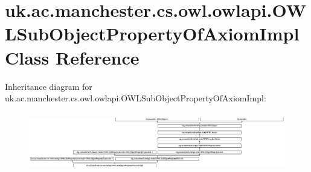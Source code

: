\hypertarget{classuk_1_1ac_1_1manchester_1_1cs_1_1owl_1_1owlapi_1_1_o_w_l_sub_object_property_of_axiom_impl}{\section{uk.\-ac.\-manchester.\-cs.\-owl.\-owlapi.\-O\-W\-L\-Sub\-Object\-Property\-Of\-Axiom\-Impl Class Reference}
\label{classuk_1_1ac_1_1manchester_1_1cs_1_1owl_1_1owlapi_1_1_o_w_l_sub_object_property_of_axiom_impl}
}
Inheritance diagram for uk.\-ac.\-manchester.\-cs.\-owl.\-owlapi.\-O\-W\-L\-Sub\-Object\-Property\-Of\-Axiom\-Impl\-:\begin{figure}[H]
\begin{center}
\leavevmode
\includegraphics[height=2.615295cm]{classuk_1_1ac_1_1manchester_1_1cs_1_1owl_1_1owlapi_1_1_o_w_l_sub_object_property_of_axiom_impl}
\end{center}
\end{figure}
